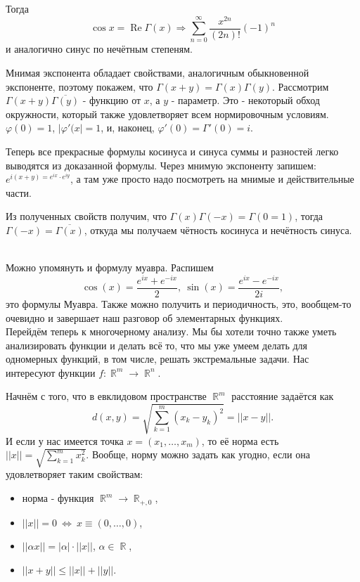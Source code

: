 \documentclass[a4paper,100pt]{article}
\theoremstyle{indented}
\theoremstyle{definition}
\theoremstyle{remark}
\DeclareMathOperator{\Real}{Re}
\DeclareMathOperator{\RR}{\mathbb{R}}
\begin{document}
Тогда 
\[
    \cos x = \Real \Gamma(x) \Rightarrow \sum_{n=0}^\infty\frac{x^{2n}}{(2n)!}(-1)^n
\]
и аналогично синус по нечётным степеням. \ 

Мнимая экспонента обладает свойствами, аналогичным обыкновенной экспоненте, поэтому покажем, что $\Gamma(x+y)=\Gamma(x)\Gamma(y)$. Рассмотрим $\Gamma(x+y)\overline{\Gamma(y)}$ - функцию от $x$, а $y$ - параметр. Это - некоторый обход окружности, который также удовлетворяет всем нормировочным условиям. $\varphi(0)=1$, $|\varphi'(x|=1$, и, наконец, $\varphi'(0)=\Gamma'(0)= i$. \ 

Теперь все прекрасные формулы косинуса и синуса суммы и разностей легко выводятся из доказанной формулы. Через мнимую экспоненту запишем: $e^{i(x+y)=e^{ix}\cdot e^{iy}}$, а там уже просто надо посмотреть на мнимые и действительные части. \ 

Из полученных свойств получим, что $\Gamma(x)\Gamma(-x)=\Gamma(0=1)$, тогда $\Gamma(-x)=\overline{\Gamma(x)}$, откуда мы получаем чётность косинуса и нечётность синуса. \ 

Можно упомянуть и формулу муавра. Распишем 
\[
    \cos(x)=\frac{e^{ix}+e^{-ix}}{2}, \: \sin(x)=\frac{e^{ix}-e^{-ix}}{2i}, 
\]
это формулы Муавра. Также можно получить и периодичность, это, вообщем-то очевидно и завершает наш разговор об элементарных функциях. \\

Перейдём теперь к многочерному анализу. Мы бы хотели точно также уметь анализировать функции и делать всё то, что мы уже умеем делать для одномерных функций, в том числе, решать экстремальные задачи. Нас интересуют функции $f:\RR^m\rightarrow \RR^n$. \ 

Начнём с того, что в евклидовом пространстве $\RR^m$ расстояние задаётся как 
\[
    d(x, y)=\sqrt{\sum_{k=1}^m(x_k-y_k)^2}=||x-y||.
\]
И если у нас имеется точка $x=(x_1, \ldots, x_m)$, то её норма есть $||x||=\sqrt{\sum_{k=1}^mx_k^2}$. Вообще, норму можно задать как угодно, если она удовлетворяет таким свойствам: 

\begin{itemize}
    \item норма - функция $\RR^m\rightarrow \RR_{+, 0}$, 
    \item $||x||=0 \: \Leftrightarrow \: x\equiv (0,\ldots, 0)$, 
    \item $||\alpha x||=|\alpha|\cdot||x||$, $\alpha\in \RR$, 
    \item $||x+y||\leq ||x||+||y||$. 
\end{itemize}
\end{document}
